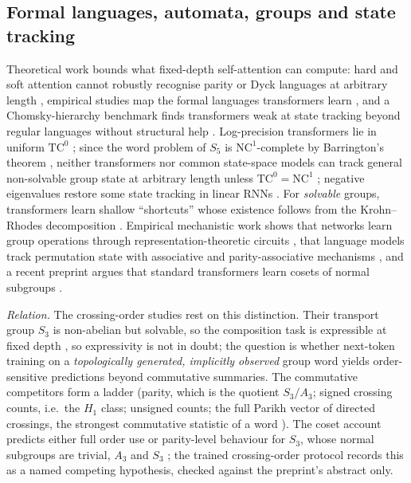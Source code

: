 \documentclass[11pt,a4paper]{article}
\DeclareRobustCommand{\_}{\ifmmode\origunderscore\else\textunderscore\allowbreak\fi}
\begin{document}
\subsection{Formal languages, automata, groups and state tracking}
Theoretical work bounds what fixed-depth self-attention can compute: hard and soft attention
cannot robustly recognise parity or Dyck languages at arbitrary length \citep{hahn2020theoretical},
empirical studies map the formal languages transformers learn \citep{bhattamishra2020ability},
and a Chomsky-hierarchy benchmark finds transformers weak at state tracking beyond regular
languages without structural help \citep{deletang2023chomsky}. Log-precision transformers lie in
uniform $\mathrm{TC}^0$ \citep{merrill2023parallelism}; since the word problem of $S_5$ is
$\mathrm{NC}^1$-complete by Barrington's theorem \citep{barrington1989bounded}, neither
transformers nor common state-space models can track general non-solvable group state at
arbitrary length unless $\mathrm{TC}^0=\mathrm{NC}^1$ \citep{merrill2024illusion,sarrof2024expressive};
negative eigenvalues restore some state tracking in linear RNNs \citep{grazzi2025unlocking}.
For \emph{solvable} groups, transformers learn shallow ``shortcuts'' whose existence follows from
the Krohn--Rhodes decomposition \citep{liu2023shortcuts,krohn1965algebraic}. Empirical
mechanistic work shows that networks learn group operations through representation-theoretic
circuits \citep{chughtai2023toy}, that language models track permutation state with associative
and parity-associative mechanisms \citep{li2025track}, and a recent preprint argues that standard
transformers learn cosets of normal subgroups \citep{zhang2026cosets}.

\emph{Relation.} The crossing-order studies rest on this distinction. Their transport group $S_3$ is
non-abelian but solvable, so the composition task is expressible at fixed depth
\citep{liu2023shortcuts}, so expressivity is not in doubt; the question is whether next-token training on a
\emph{topologically generated, implicitly observed} group word yields order-sensitive predictions
beyond commutative summaries. The commutative competitors form a ladder (parity, which is
the quotient $S_3/A_3$; signed crossing counts, i.e.\ the $H_1$ class; unsigned counts; the full
Parikh vector of directed crossings, the strongest commutative statistic of a word
\citep{parikh1966context}). The coset account predicts either full order use or parity-level
behaviour for $S_3$, whose normal subgroups are trivial, $A_3$ and $S_3$ \citep{zhang2026cosets};
the trained crossing-order protocol records this as a named competing hypothesis, checked
against the preprint's abstract only.
\end{document}
